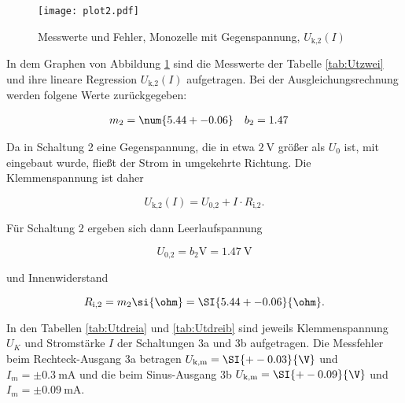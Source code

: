   \newpage

  \begin{figure}[h]
    \centering
    \texttt{[image: plot2.pdf]}
    \caption{Messwerte und Fehler, Monozelle mit Gegenspannung, $U_\text{k,2}(I)$}
    \label{fig:Uzwei}
  \end{figure}

  In dem Graphen von Abbildung \ref{fig:Uzwei} sind die Messwerte der Tabelle
  \ref{tab:Utzwei} und ihre lineare Regression
  $U_\text{k,2}(I)$ aufgetragen.
  Bei der Ausgleichungsrechnung werden folgene Werte zurückgegeben:

  \begin{align}
    m_2 & = \num{5.44 +- 0.06} & b_2 & = 1.47
  \end{align}

  Da in Schaltung 2 eine Gegenspannung, die in etwa $\SI{2}{\V}$ größer als
  $U_0$ ist, mit eingebaut wurde, fließt der Strom in umgekehrte Richtung.
  Die Klemmenspannung ist daher

  \begin{equation}
    U_\text{k,2}(I) = U_\text{0,2} + I \cdot R_\text{i,2}.
  \end{equation}

  Für Schaltung 2 ergeben sich dann Leerlaufspannung

  \begin{equation}
    U_\text{0,2} = b_2 \si{\V} = \SI{1.47}{\V}
  \end{equation}

  und Innenwiderstand

  \begin{equation}
    R_\text{i,2} = m_2 \si{\ohm} = \SI{5.44 +- 0.06}{\ohm}.
  \end{equation}

  \newpage

  In den Tabellen \ref{tab:Utdreia} und \ref{tab:Utdreib} sind jeweils
  Klemmenspannung $U_K$ und Stromstärke $I$
  der Schaltungen 3a und 3b aufgetragen.
  Die Messfehler beim Rechteck-Ausgang 3a betragen
  $U_\text{k,m} = \SI{+-0.03}{\V}$ und $I_m = \pm \SI{0.3}{\milli\A}$ und die
  beim Sinus-Ausgang 3b $U_\text{k,m} = \SI{+-0.09}{\V}$ und
  $I_m = \pm \SI{0.09}{\milli\A}$.

